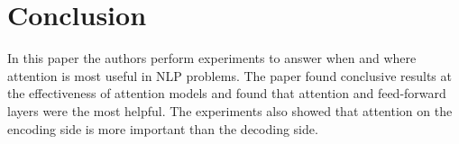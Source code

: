 \FloatBarrier
\section{Conclusion}

In this paper the authors perform experiments to answer when and where attention
is most useful in NLP problems. The paper found conclusive results at the
effectiveness of attention models and found that attention and feed-forward
layers were the most helpful. The experiments also showed that attention on the
encoding side is more important than the decoding side. 


